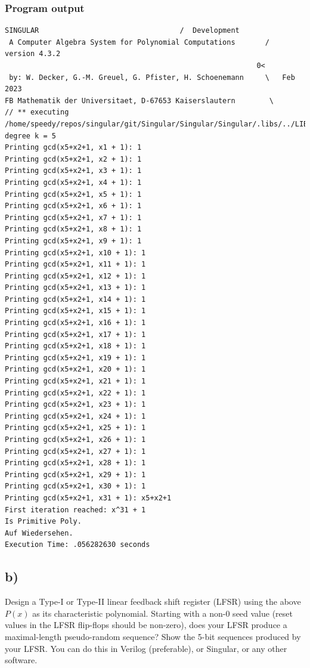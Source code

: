 \documentclass[a4paper,11pt]{exam}
\begin{document}
\subsubsection{Program output}
\label{sec:org9429d8b}
\begin{lstlisting}[language=sing]
                     SINGULAR                                 /  Development
 A Computer Algebra System for Polynomial Computations       /   version 4.3.2
                                                           0<
 by: W. Decker, G.-M. Greuel, G. Pfister, H. Schoenemann     \   Feb 2023
FB Mathematik der Universitaet, D-67653 Kaiserslautern        \
// ** executing /home/speedy/repos/singular/git/Singular/Singular/Singular/.libs/../LIB/.singularrc
degree k = 5
Printing gcd(x5+x2+1, x1 + 1): 1
Printing gcd(x5+x2+1, x2 + 1): 1
Printing gcd(x5+x2+1, x3 + 1): 1
Printing gcd(x5+x2+1, x4 + 1): 1
Printing gcd(x5+x2+1, x5 + 1): 1
Printing gcd(x5+x2+1, x6 + 1): 1
Printing gcd(x5+x2+1, x7 + 1): 1
Printing gcd(x5+x2+1, x8 + 1): 1
Printing gcd(x5+x2+1, x9 + 1): 1
Printing gcd(x5+x2+1, x10 + 1): 1
Printing gcd(x5+x2+1, x11 + 1): 1
Printing gcd(x5+x2+1, x12 + 1): 1
Printing gcd(x5+x2+1, x13 + 1): 1
Printing gcd(x5+x2+1, x14 + 1): 1
Printing gcd(x5+x2+1, x15 + 1): 1
Printing gcd(x5+x2+1, x16 + 1): 1
Printing gcd(x5+x2+1, x17 + 1): 1
Printing gcd(x5+x2+1, x18 + 1): 1
Printing gcd(x5+x2+1, x19 + 1): 1
Printing gcd(x5+x2+1, x20 + 1): 1
Printing gcd(x5+x2+1, x21 + 1): 1
Printing gcd(x5+x2+1, x22 + 1): 1
Printing gcd(x5+x2+1, x23 + 1): 1
Printing gcd(x5+x2+1, x24 + 1): 1
Printing gcd(x5+x2+1, x25 + 1): 1
Printing gcd(x5+x2+1, x26 + 1): 1
Printing gcd(x5+x2+1, x27 + 1): 1
Printing gcd(x5+x2+1, x28 + 1): 1
Printing gcd(x5+x2+1, x29 + 1): 1
Printing gcd(x5+x2+1, x30 + 1): 1
Printing gcd(x5+x2+1, x31 + 1): x5+x2+1
First iteration reached: x^31 + 1
Is Primitive Poly.
Auf Wiedersehen.
Execution Time: .056282630 seconds
\end{lstlisting}

\subsection{b)}
\label{sec:org0a5b6ca}
Design a Type-I or Type-II linear feedback shift register (LFSR) using the above $P(x)$ as its characteristic polynomial. Starting with a non-0 seed value (reset values in the LFSR flip-flops should be non-zero), does your LFSR produce a maximal-length pseudo-random sequence? Show the 5-bit sequences produced by your LFSR. You can do this in Verilog (preferable), or Singular, or any other software.
\newpage
\end{document}

